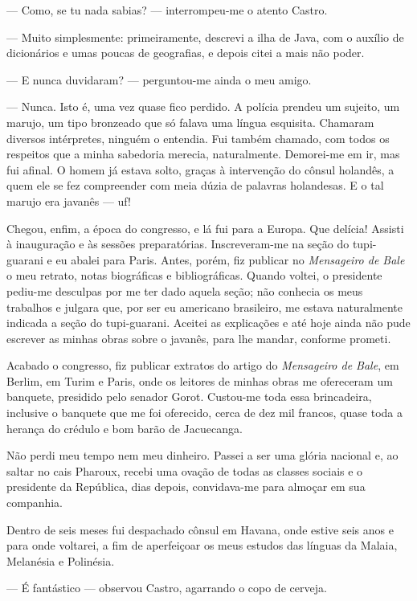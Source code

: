 --- Como, se tu nada sabias? --- interrompeu-me o atento Castro.

--- Muito simplesmente: primeiramente, descrevi a ilha de Java, com o
auxílio de dicionários e umas poucas de geografias, e depois citei a
mais não poder.

--- E nunca duvidaram? --- perguntou-me ainda o meu amigo.

--- Nunca. Isto é, uma vez quase fico perdido. A polícia prendeu um
sujeito, um marujo, um tipo bronzeado que só falava uma língua
esquisita. Chamaram diversos intérpretes, ninguém o entendia. Fui também
chamado, com todos os respeitos que a minha sabedoria merecia,
naturalmente. Demorei-me em ir, mas fui afinal. O homem já estava solto,
graças à intervenção do cônsul holandês, a quem ele se fez compreender
com meia dúzia de palavras holandesas. E o tal marujo era javanês ---
uf!

Chegou, enfim, a época do congresso, e lá fui para a Europa. Que
delícia! Assisti à inauguração e às sessões preparatórias.
Inscreveram-me na seção do tupi-guarani e eu abalei para Paris. Antes,
porém, fiz publicar no \emph{Mensageiro de Bale} o meu retrato, notas
biográficas e bibliográficas. Quando voltei, o presidente pediu-me
desculpas por me ter dado aquela seção; não conhecia os meus trabalhos e
julgara que, por ser eu americano brasileiro, me estava naturalmente
indicada a seção do tupi-guarani. Aceitei as explicações e até hoje
ainda não pude escrever as minhas obras sobre o javanês, para lhe
mandar, conforme prometi.

Acabado o congresso, fiz publicar extratos do artigo do \emph{Mensageiro
de Bale}, em Berlim, em Turim e Paris, onde os leitores de minhas obras
me ofereceram um banquete, presidido pelo senador Gorot. Custou-me toda
essa brincadeira, inclusive o banquete que me foi oferecido, cerca de
dez mil francos, quase toda a herança do crédulo e bom barão de
Jacuecanga.

Não perdi meu tempo nem meu dinheiro. Passei a ser uma glória nacional
e, ao saltar no cais Pharoux, recebi uma ovação de todas as classes
sociais e o presidente da República, dias depois, convidava-me para
almoçar em sua companhia.

Dentro de seis meses fui despachado cônsul em Havana, onde estive seis
anos e para onde voltarei, a fim de aperfeiçoar os meus estudos das
línguas da Malaia, Melanésia e Polinésia.

--- É fantástico --- observou Castro, agarrando o copo de cerveja.

